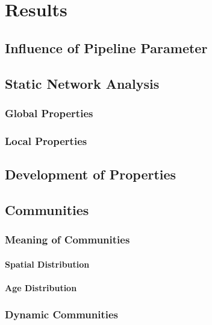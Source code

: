 \chapter{Results}

\section{Influence of Pipeline Parameter}

\section{Static Network Analysis}

\subsection{Global Properties}

\subsection{Local Properties}

\section{Development of Properties}

\section{Communities}

\subsection{Meaning of Communities}

\subsubsection{Spatial Distribution}

\subsubsection{Age Distribution}

\subsection{Dynamic Communities}